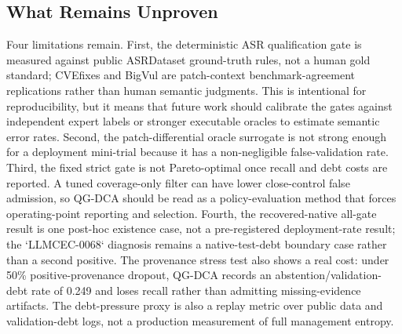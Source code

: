﻿\documentclass[lettersize,journal]{IEEEtran}
\begin{document}
\subsection{What Remains Unproven}
Four limitations remain. First, the deterministic ASR qualification gate is measured against public ASRDataset ground-truth rules, not a human gold standard; CVEfixes and BigVul are patch-context benchmark-agreement replications rather than human semantic judgments. This is intentional for reproducibility, but it means that future work should calibrate the gates against independent expert labels or stronger executable oracles to estimate semantic error rates. Second, the patch-differential oracle surrogate is not strong enough for a deployment mini-trial because it has a non-negligible false-validation rate. Third, the fixed strict gate is not Pareto-optimal once recall and debt costs are reported. A tuned coverage-only filter can have lower close-control false admission, so QG-DCA should be read as a policy-evaluation method that forces operating-point reporting and selection. Fourth, the recovered-native all-gate result is one post-hoc existence case, not a pre-registered deployment-rate result; the `LLMCEC-0068` diagnosis remains a native-test-debt boundary case rather than a second positive. The provenance stress test also shows a real cost: under 50\% positive-provenance dropout, QG-DCA records an abstention/validation-debt rate of 0.249 and loses recall rather than admitting missing-evidence artifacts. The debt-pressure proxy is also a replay metric over public data and validation-debt logs, not a production measurement of full management entropy.
\end{document}
